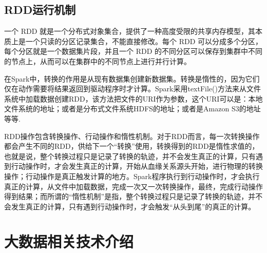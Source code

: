 \documentclass[UTF8,a4paper,10pt,nocolorlinks]{ctexart}
\begin{document}
\subsection{RDD运行机制}
一个 RDD 就是一个分布式对象集合，提供了一种高度受限的共享内存模型，其本质上是一个只读的分区记录集合，不能直接修改。每个 RDD 可以分成多个分区，每个分区就是一个数据集片段，并且一个 RDD 的不同分区可以保存到集群中不同的节点上，从而可以在集群中的不同节点上进行并行计算。\par
在Spark中，转换的作用是从现有数据集创建新数据集。转换是惰性的，因为它们仅在动作需要将结果返回到驱动程序时才计算。Spark采用textFile()方法来从文件系统中加载数据创建RDD，该方法把文件的URI作为参数，这个URI可以是：本地文件系统的地址；或者是分布式文件系统HDFS的地址；或者是Amazon S3的地址等等.\par
RDD操作包含转换操作、行动操作和惰性机制。对于RDD而言，每一次转换操作都会产生不同的RDD，供给下一个“转换”使用，转换得到的RDD是惰性求值的，也就是说，整个转换过程只是记录了转换的轨迹，并不会发生真正的计算，只有遇到行动操作时，才会发生真正的计算，开始从血缘关系源头开始，进行物理的转换操作；行动操作是真正触发计算的地方。Spark程序执行到行动操作时，才会执行真正的计算，从文件中加载数据，完成一次又一次转换操作，最终，完成行动操作得到结果；而所谓的“惰性机制”是指，整个转换过程只是记录了转换的轨迹，并不会发生真正的计算，只有遇到行动操作时，才会触发“从头到尾”的真正的计算。

\section{大数据相关技术介绍}
\end{document}
